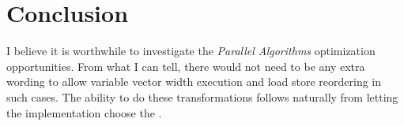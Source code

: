 \section{Conclusion}

I believe it is worthwhile to investigate the \emph{Parallel Algorithms} optimization opportunities.
From what I can tell, there would not need to be any extra wording to allow variable vector width execution and load store reordering in such cases.
The ability to do these transformations follows naturally from letting the implementation choose the .

